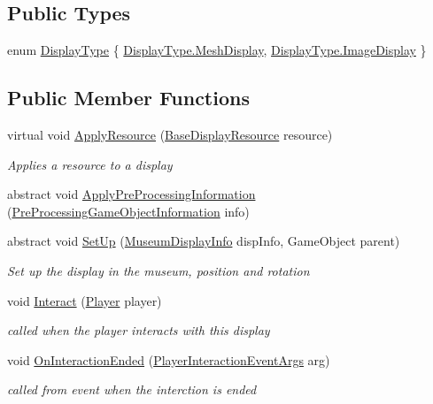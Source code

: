 \subsection*{Public Types}
\begin{DoxyCompactItemize}
\item 
enum \mbox{\hyperlink{class_display_a7f7abc559192ef7e8f4a03382d3492d7}{Display\+Type}} \{ \mbox{\hyperlink{class_display_a7f7abc559192ef7e8f4a03382d3492d7a6465642df623349960f917dcf68ba989}{Display\+Type.\+Mesh\+Display}}, 
\mbox{\hyperlink{class_display_a7f7abc559192ef7e8f4a03382d3492d7a6790a36b5a0528029d4ed43891266fcb}{Display\+Type.\+Image\+Display}}
 \}
\end{DoxyCompactItemize}
\subsection*{Public Member Functions}
\begin{DoxyCompactItemize}
\item 
virtual void \mbox{\hyperlink{class_display_a811157ddb42ae4d72f690457a08711d3}{Apply\+Resource}} (\mbox{\hyperlink{class_base_display_resource}{Base\+Display\+Resource}} resource)
\begin{DoxyCompactList}\small\item\em Applies a resource to a display \end{DoxyCompactList}\item 
abstract void \mbox{\hyperlink{class_display_ab9cd24c11c43dd87bc50e85a8e9e4c31}{Apply\+Pre\+Processing\+Information}} (\mbox{\hyperlink{class_pre_processing_game_object_information}{Pre\+Processing\+Game\+Object\+Information}} info)
\item 
abstract void \mbox{\hyperlink{class_display_a57325251fbeac943cd48520e50f0bec4}{Set\+Up}} (\mbox{\hyperlink{class_museum_display_info}{Museum\+Display\+Info}} disp\+Info, Game\+Object parent)
\begin{DoxyCompactList}\small\item\em Set up the display in the museum, position and rotation \end{DoxyCompactList}\item 
void \mbox{\hyperlink{class_display_a43fc2a6f19bbf2f1bdb676392b37e921}{Interact}} (\mbox{\hyperlink{class_player}{Player}} player)
\begin{DoxyCompactList}\small\item\em called when the player interacts with this display \end{DoxyCompactList}\item 
void \mbox{\hyperlink{class_display_a29f45efdf15e97219d2c8a614d699da8}{On\+Interaction\+Ended}} (\mbox{\hyperlink{class_player_interaction_event_args}{Player\+Interaction\+Event\+Args}} arg)
\begin{DoxyCompactList}\small\item\em called from event when the interction is ended \end{DoxyCompactList}\end{DoxyCompactItemize}
